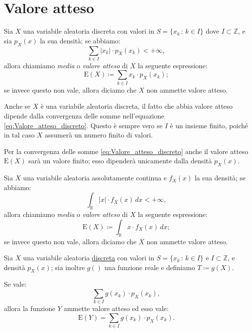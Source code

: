     \section{Valore atteso}\label{sec:Valore_atteso}
    \begin{defn}[discreto]\label{defn:Valore_atteso_discreto}
            Sia $X$ una variabile aleatoria discreta con valori in $S = \{x_k \,:\, k \in I\}$ dove $I \subset \mathbb{Z}$, e sia $p_X(x)$ la sua densità; se abbiamo: \[
                \sum_{k \in I} \left|x_k\right| \cdot p_X(x_k) < +\infty
            ,\] allora chiamiamo \emph{media} o \emph{valore atteso} di $X$ la seguente espressione:
            \begin{equation}\label{eq:Valore_atteso_discreto}
                \text{E}(X) \coloneqq \sum_{k \in I}x_k \cdot p_X(x_k)
            ;\end{equation}
            se invece questo non vale, allora diciamo che $X$ non ammette valore atteso.
        \end{defn}
        \begin{obsv}
            Anche se $X$ è una variabile aleatoria discreta, il fatto che abbia valore atteso dipende dalla convergenza delle somme nell'equazione \eqref{eq:Valore_atteso_discreto}. Questo è sempre vero se $I$ è un insieme finito, poiché in tal caso $X$ assumerà un numero finito di valori.

            Per la convergenza delle somme \eqref{eq:Valore_atteso_discreto} anche il valore atteso $\text{E}(X)$ sarà un valore finito; esso dipenderà unicamente dalla densità $p_X(x)$.
        \end{obsv}
        \begin{defn}[continuo]\label{defn:Valore_atteso_continuo}
            Sia $X$ una variabile aleatoria assolutamente continua e $f_X(x)$ la sua densità; se abbiamo: \[
                \int_{\mathbb{R}} |x| \cdot f_X(x)\, dx < +\infty 
            ,\] allora chiamiamo \emph{media} o \emph{valore atteso}  di $X$ la seguente espressione:
            \begin{equation}\label{eq:Valore_atteso_continuo}
                \text{E}(X) \coloneqq \int_{\mathbb{R}} x \cdot f_X(x)\, dx
            ;\end{equation}
            se invece questo non vale, allora diciamo che $X$ non ammette valore atteso.
        \end{defn}
        \begin{defn}[discreta]
            Sia $X$ una variabile aleatoria \underline{discreta} con valori in $S = \{x_k \,:\, k \in I\}$ e $I \subset \mathbb{Z}$, e densità $p_X(x)$; sia inoltre $g()$ una funzione reale  e definiamo $T \coloneqq  g(X)$.

            Se vale: \[
                \sum_{k \in I} g(x_k)  \cdot p_X(x_k)
            ,\] allora la funzione $Y$ ammette valore atteso ed esso vale:
            \begin{equation}\label{eq:Valore_atteso_funzione_discreta}
                \text{E}(Y) = \sum_{k \in I} g(x_k) \cdot p_X(x_k)
            .\end{equation}
        \end{defn}
